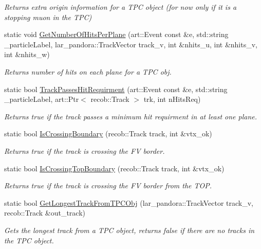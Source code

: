 \begin{DoxyCompactItemize}
\begin{DoxyCompactList}\small\item\em \-Returns extra origin information for a \-T\-P\-C object (for now only if it is a stopping muon in the \-T\-P\-C) \end{DoxyCompactList}\item 
static void \hyperlink{classUBXSecHelper_a5d811318d7fb66ab5e1816453c017e63}{\-Get\-Number\-Of\-Hits\-Per\-Plane} (art\-::\-Event const \&e, std\-::string \-\_\-particle\-Label, lar\-\_\-pandora\-::\-Track\-Vector track\-\_\-v, int \&nhits\-\_\-u, int \&nhits\-\_\-v, int \&nhits\-\_\-w)
\begin{DoxyCompactList}\small\item\em \-Returns number of hits on each plane for a \-T\-P\-C obj. \end{DoxyCompactList}\item 
static bool \hyperlink{classUBXSecHelper_accf62c400d9e984f1277843de78715a7}{\-Track\-Passes\-Hit\-Requirment} (art\-::\-Event const \&e, std\-::string \-\_\-particle\-Label, art\-::\-Ptr$<$ recob\-::\-Track $>$ trk, int n\-Hits\-Req)
\begin{DoxyCompactList}\small\item\em \-Returns true if the track passes a minimum hit requirment in at least one plane. \end{DoxyCompactList}\item 
static bool \hyperlink{classUBXSecHelper_aef82eb512853d8bd9a40fca00f254b7e}{\-Is\-Crossing\-Boundary} (recob\-::\-Track track, int \&vtx\-\_\-ok)
\begin{DoxyCompactList}\small\item\em \-Returns true if the track is crossing the \-F\-V border. \end{DoxyCompactList}\item 
static bool \hyperlink{classUBXSecHelper_af2924ae512f2c8cc5be6feb2bd21a112}{\-Is\-Crossing\-Top\-Boundary} (recob\-::\-Track track, int \&vtx\-\_\-ok)
\begin{DoxyCompactList}\small\item\em \-Returns true if the track is crossing the \-F\-V border from the \-T\-O\-P. \end{DoxyCompactList}\item 
static bool \hyperlink{classUBXSecHelper_a76b009afef0cc69f281ca3215a901f35}{\-Get\-Longest\-Track\-From\-T\-P\-C\-Obj} (lar\-\_\-pandora\-::\-Track\-Vector track\-\_\-v, recob\-::\-Track \&out\-\_\-track)
\begin{DoxyCompactList}\small\item\em \-Gets the longest track from a \-T\-P\-C object, returns false if there are no tracks in the \-T\-P\-C object. \end{DoxyCompactList}\item 

\end{DoxyCompactItemize}
